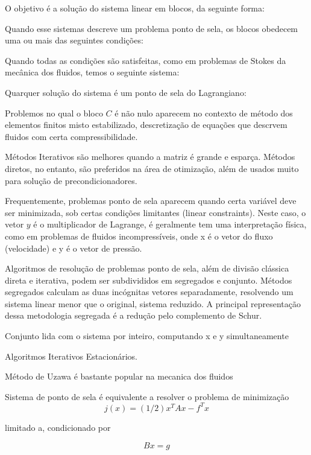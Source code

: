 \documentclass[12pt]{article}
\begin{document}
O objetivo é a solução do sistema linear em blocos, da seguinte forma:

Quando esse sistemas descreve um problema ponto de sela, os blocos obedecem uma ou mais das seguintes condições:

Quando todas as condições são satisfeitas, como em problemas de Stokes da mecânica dos fluidos, temos o seguinte sistema:

Quarquer solução do sistema é um ponto de sela do Lagrangiano:

Problemos no qual o bloco \(C\) é não nulo aparecem no contexto de método dos elementos finitos misto estabilizado, descretização de equações que descrvem fluidos com certa compressibilidade.

Métodos Iterativos são melhores quando a matriz é grande e esparça. Métodos diretos, no entanto, são preferidos na área de otimização, além de usados muito para solução de precondicionadores. 

Frequentemente, problemas ponto de sela aparecem quando certa variável deve ser minimizada, sob certas condições limitantes (linear constraints). Neste caso, o vetor \(y\) é o multiplicador de Lagrange, é geralmente tem uma interpretação física, como em problemas de fluidos incompressíveis, onde x é o vetor do fluxo (velocidade) e y é o vetor de pressão. 

Algoritmos de resolução de problemas ponto de sela, além de divisão clássica direta e iterativa, podem ser subdivididos em segregados e conjunto. Métodos segregados calculam as duas incógnitas vetores separadamente, resolvendo um sistema linear menor que o original, sistema reduzido. A principal representação dessa metodologia segregada é a redução pelo complemento de Schur.

Conjunto lida com o sistema por inteiro, computando x e y simultaneamente

Algoritmos Iterativos Estacionários. 

Método de Uzawa é bastante popular na mecanica dos fluidos 

Sistema de ponto de sela é equivalente a resolver o problema de minimização 
\begin{equation}
    j(x)=(1/2)x^TAx-f^Tx
    \label{eq:eq9}
\end{equation}

limitado a, condicionado por 

\begin{equation}
    Bx=g
    \label{eq:eq9}
\end{equation}
\end{document}
